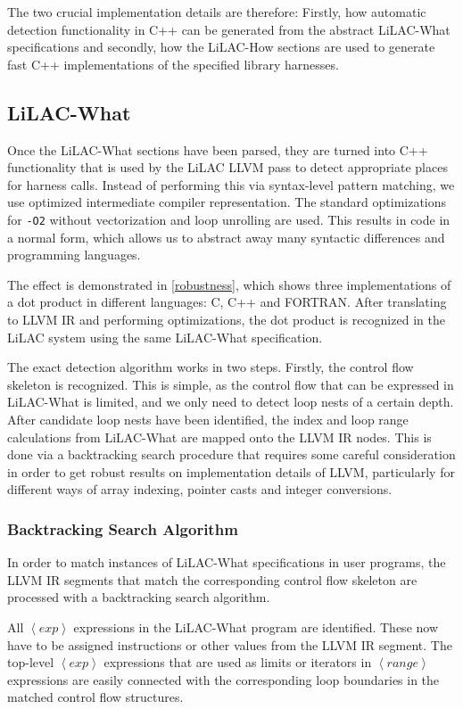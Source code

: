     The two crucial implementation details are therefore:
    Firstly, how automatic detection functionality in C++ can be generated from
    the abstract LiLAC-What specifications and \linebreak
    secondly, how the LiLAC-How sections are used to generate fast C++
    implementations of the specified library harnesses.

\subsection{LiLAC-What}
Once the LiLAC-What sections have been parsed, they are turned into C++
functionality that is used by the LiLAC LLVM pass to detect appropriate places
for harness calls.
Instead of performing this via syntax-level pattern matching, we use optimized
intermediate compiler representation.
The standard optimizations for \texttt{-O2} without vectorization and loop
unrolling are used.
This results in code in a normal form, which allows us to abstract away many
syntactic differences and programming languages.

The effect is demonstrated in \autoref{robustness}, which shows three
implementations of a dot product in different languages: C, C++ and FORTRAN.
After translating to LLVM IR and performing optimizations, the dot product is
recognized in the LiLAC system using the same LiLAC-What specification.

The exact detection algorithm works in two steps.
Firstly, the control flow skeleton is recognized.
This is simple, as the control flow that can be expressed in LiLAC-What is
limited, and we only need to detect loop nests of a certain depth.
After candidate loop nests have been identified, the index and loop range
calculations from LiLAC-What are mapped onto the LLVM IR nodes.
This is done via a backtracking search procedure that requires some careful
consideration in order to get robust results on implementation details of LLVM,
particularly for different ways of array indexing, pointer casts and integer
conversions.

\subsubsection{Backtracking Search Algorithm}
In order to match instances of LiLAC-What specifications in user programs,
the LLVM IR segments that match the corresponding control flow skeleton are
processed with a backtracking search algorithm.

All $\left<exp\right>$ expressions in the LiLAC-What program are identified.
These now have to be assigned instructions or other values from the LLVM IR
segment. The top-level $\left<exp\right>$ expressions that are used as limits or
iterators in $\left<range\right>$ expressions are easily connected with the
corresponding loop boundaries in the matched control flow structures.

